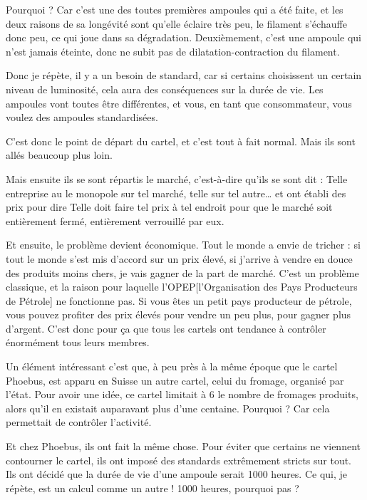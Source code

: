\begin{small}
Pourquoi ? Car c'est une des toutes premières ampoules qui a été faite, et les deux raisons de sa longévité sont qu'elle éclaire très peu, le filament s'échauffe donc peu, ce qui joue dans sa dégradation. Deuxièmement, c'est une ampoule qui n'est jamais éteinte, donc ne subit pas de dilatation-contraction du filament.

Donc je répète, il y a un besoin de standard, car si certains choisissent un certain niveau de luminosité, cela aura des conséquences sur la durée de vie.
Les ampoules vont toutes être différentes, et vous, en tant que consommateur, vous voulez des ampoules standardisées.

\medbreak

C'est  donc le point de départ du cartel, et c'est tout à fait normal. Mais ils sont allés beaucoup plus loin.

Mais ensuite ils se sont répartis le marché, c'est-à-dire qu'ils se sont dit : \og  
Telle entreprise au le monopole sur tel marché, telle sur tel autre\dots  \fg{} et ont établi des prix pour dire  \og Telle doit faire tel prix à tel endroit  \fg{} pour que le marché soit entièrement fermé, entièrement verrouillé par eux.

 Et ensuite, le problème devient économique. Tout le monde a envie de tricher : si tout le monde s'est mis d'accord sur un prix élevé, si j'arrive à vendre en douce des produits moins chers, je vais gagner de la part de marché. C'est un problème classique, et la raison pour laquelle l'OPEP[l'Organisation des Pays Producteurs de Pétrole] ne fonctionne pas. Si vous êtes un petit pays producteur de pétrole, vous pouvez profiter des prix élevés pour vendre un peu plus, pour gagner plus d'argent.  C'est donc pour ça que tous les cartels ont tendance à contrôler énormément tous leurs membres.
 
\smallbreak 
 
Un élément intéressant c'est que, à peu près à la même époque que le cartel Phoebus, est apparu en Suisse un autre cartel, celui du fromage, organisé par l'état. Pour avoir une idée, ce cartel limitait à 6 le nombre de fromages produits, alors qu'il en existait auparavant plus d'une centaine. Pourquoi ? Car cela permettait de contrôler l'activité.

\smallbreak

Et chez Phoebus, ils ont fait la même chose. Pour éviter que certains ne viennent contourner le cartel, ils ont imposé des standards extrêmement stricts sur tout.
Ils ont décidé que la durée de vie d'une ampoule serait 1000 heures. Ce qui, je répète, est un calcul comme un autre ! 1000 heures, pourquoi pas ?


\end{small}
